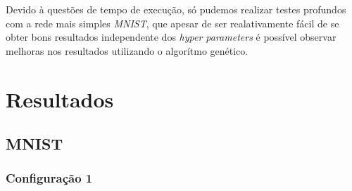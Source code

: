 \documentclass[twoside,conference,a4paper]{IEEEtran}
\begin{document}
Devido à questões de tempo de execução, só pudemos realizar testes profundos com a rede mais simples \emph{MNIST}, que apesar de ser realativamente fácil de se obter bons resultados independente dos \emph{hyper parameters} é possível observar melhoras nos resultados utilizando o algorítmo genético.


\section{Resultados}

\subsection{MNIST}

\subsubsection{Configuração 1}
\end{document}
